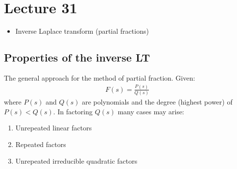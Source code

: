
\chapter*{Lecture 31}

\begin{recall}{}{}
\begin{itemize}
\item Inverse Laplace transform (partial fractions)
\end{itemize}
\end{recall}


\section*{Properties of the inverse LT}
The general approach for the method of partial fraction. Given:
\begin{align*}
F(s)=\frac{P(s)}{Q(s)}
\end{align*}
where $P(s)$ and $Q(s)$ are polynomials and the degree (highest power) of $P(s)<Q(s)$. In factoring $Q(s)$ many cases may arise:

\begin{enumerate}
\item Unrepeated linear factors
\item Repeated factors
\item Unrepeated irreducible quadratic factors
\end{enumerate}


